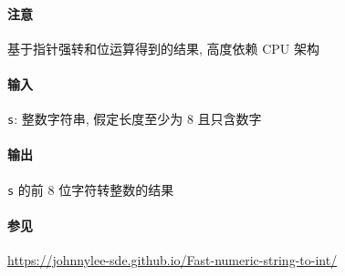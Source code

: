 \paragraph{注意}

基于指针强转和位运算得到的结果, 高度依赖 CPU 架构

\paragraph{输入}

\verb|s|: 整数字符串, 假定长度至少为 8 且只含数字

\paragraph{输出}

\verb|s| 的前 8 位字符转整数的结果

\paragraph{参见}

\url{https://johnnylee-sde.github.io/Fast-numeric-string-to-int/}
